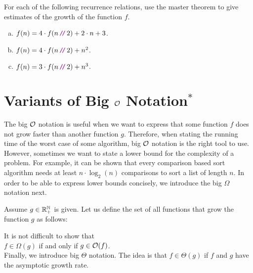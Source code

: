 \exercise
For each of the following recurrence relations, use the master theorem to give estimates of the
growth of the function $f$. 
\begin{enumerate}[(a)]
\item $f(n) = 4 \cdot f(n \dv 2) + 2 \cdot n + 3$.
\item $f(n) = 4 \cdot f(n \dv 2) + n^2$.
\item $f(n) = 3 \cdot f(n \dv 2) + n^3$.  \eox
\end{enumerate}



\section{Variants of Big $\mathcal{O}$ Notation$^*$}
The big $\mathcal{O}$ notation is useful when we want to express that some function $f$ does not grow faster
than another function $g$.  Therefore, when stating the running time of the worst case of some algorithm,
big $\mathcal{O}$ notation is the right tool to use.  However, sometimes we want to state a lower bound for
the complexity of a problem.  For example, it can be shown that every comparison based sort algorithm needs at least
$n \cdot \log_2(n)$ comparisons to sort a list of length $n$.  In order to be able to express lower
bounds concisely, we introduce the big $\Omega$ notation next.

\begin{Definition}[$\Omega(g)$] 
  Assume $g \in {\mathbb R}_+^{{\mathbb N}}$ is given.   Let us define the set of all functions that grow 
   the function $g$ as follows:
  \\[0.2cm]
  \hspace*{0.5cm} 
  \colorbox{red}{}
  \eox
\end{Definition}
It is not difficult to show that
\\[0.2cm]
\hspace*{1.3cm}
 $f \in \Omega(g)$ \quad if and only if \quad $g \in \mathcal{O}(f)$.
\\[0.2cm]
Finally, we introduce big $\Theta$ notation.  The idea is that $f \in \Theta(g)$ if 
$f$ and $g$ have the  asymptotic growth rate. 

